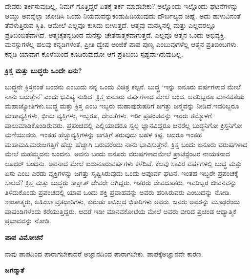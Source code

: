 ದೇವರು ತರ್ಕಿಸುವುದಿಲ್ಲ. ನಿಮಗೆ ಗೊತ್ತಿದ್ದರೆ ಏತಕ್ಕೆ ತರ್ಕ ಮಾಡಬೇಕು? ಅಲ್ಲೊಂದು ಇಲ್ಲೊಂದು ಘಟನೆಗಳನ್ನು ಆಯ್ದು ಅವನ್ನೆಲ್ಲಾ ಜೋಡಿಸಿ ಒಂದು ನಿಯಮವನ್ನು\break ಕಂಡುಹಿಡಿಯುವುದು ದೌರ್ಬಲ್ಯದ ಚಿಹ್ನೆ. ಅದು ಹುಳುವಿನಂತೆ ತೆವಳುತ್ತಿರುವ ಸ್ಥಿತಿ. ಆಮೇಲೆ ಎಲ್ಲವೂ ಕುಸಿದು ಬೀಳುತ್ತದೆ. ಆತ್ಮವು ಮನಸ್ಸಿನಲ್ಲಿ ಮತ್ತು ಎಲ್ಲದರಲ್ಲೂ ಪ್ರತಿಬಿಂಬಿತವಾಗಿದೆ. ಆತ್ಮಚೈತನ್ಯದಿಂದ ಮನಸ್ಸು ಚೇತನಾತ್ಮಕವಾಗುತ್ತದೆ. ಎಲ್ಲವೂ ಆತ್ಮನ ಒಂದು ಅಭಿವ್ಯಕ್ತಿ. ಮನಸ್ಸುಗಳೆಲ್ಲ ಹಲವು ಕನ್ನಡಿಗಳಂತೆ, ಪ್ರೀತಿ ದ್ವೇಷ ಅಂಜಿಕೆ ಪಾಪ ಪುಣ್ಯ ಎಂಬುವುಗಳೆಲ್ಲ ಆತ್ಮನ ಪ್ರತಿಬಿಂಬಗಳು. ಕನ್ನಡಿ ಯಾವಾಗ ಕೊಳೆಯಿಂದ ಕೂಡಿರುವುದೋ ಆಗ ಪ್ರತಿಬಿಂಬ ಸ್ಪಷ್ಟವಾಗಿರುವುದಿಲ್ಲ.

\begin{center}
\textbf{ಕ್ರಿಸ್ತ ಮತ್ತು ಬುದ್ಧರು ಒಂದೇ ಏನು?}
\end{center}

ಬುದ್ಧನೇ ಕ್ರಿಸ್ತನಂತೆ ಬಂದನು ಎಂಬುದು ನನ್ನ ಒಂದು ವಿಚಿತ್ರ ಕಲ್ಪನೆ. ಬುದ್ಧ ‘ಇನ್ನು ಐನೂರು ವರ್ಷಗಳಾದ ಮೇಲೆ ನಾನು ಬರುತ್ತೇನೆ’ ಎಂದು ಭವಿಷ್ಯ ನುಡಿದ. ಕ್ರಿಸ್ತ ಐನೂರು ವರ್ಷಗಳಾದ ಮೇಲೆ ಬಂದ. ಅವರಿಬ್ಬರೂ ಮಾನವತೆಯ ಮಹಾಜ್ಯೋತಿಗಳು.\break ಬುದ್ಧ ಮತ್ತು ಕ್ರಿಸ್ತ ಎಂಬ ಇಬ್ಬರು ಮಹಾಪುರುಷರಿಗೆ ಜಗತ್ತು ಜನ್ಮವನ್ನು ನೀಡಿದೆ.\break ಇವರಿಬ್ಬರೂ ಮಹಾವ್ಯಕ್ತಿಗಳು, ಭೀಮ ವ್ಯಕ್ತಿಗಳು, ಇಬ್ಬರೂ, ದೇವತೆಗಳು. ಇಡೀ ಪ್ರಪಂಚವನ್ನು ಇವರು ತಮ್ಮೊಳಗೆ ಪಾಲುಮಾಡಿಕೊಂಡಿರುವರು. ಪ್ರಪಂಚದಲ್ಲಿ ಎಲ್ಲಿಯಾದರೂ ಸ್ವಲ್ಪ ಜ್ಞಾನವಿದ್ದರೂ ಜನರೆಲ್ಲ ಬುದ್ಧನಿಗೋ ಕ್ರಿಸ್ತನಿಗೋ ಮಣಿಯುವರು. ಇಂತಹ ಹೆಚ್ಚು\break ವ್ಯಕ್ತಿಗಳನ್ನು ಜಗತ್ತಿಗೆ ತರುವುದು ಬಹಳ ಕಷ್ಟ. ಆದರೂ ಇಂತಹ ಮಹಾಮಹಿಮರು\break ಜಗತ್ತಿಗೆ ಹೆಚ್ಚು ಹೆಚ್ಚಾಗಿ ಬರುವರೆಂದು ನಾನು ಭಾವಿಸುತ್ತೇನೆ. ಕ್ರಿಸ್ತ ಬಂದು ಐನೂರು ವರುಷಗಳಾದ ಮೇಲೆ ಮಹಮ್ಮದನು ಬಂದನು. ಅವನು ಬಂದು ಐನೂರು ವರುಷಗಳಾದ\break ಮೇಲೆ ಪ್ರಾಟೆಸ್ಟೆಂಟರ ನಾಯಕನಾದ ಲೂಥರ್​ ಬಂದನು. ಅವನಾದ ಮೇಲೆ ಐದುನೂರು\break ವರ್ಷಗಳು ಕಳೆದಿವೆ. ಕೆಲವು ಸಾವಿರ ವರ್ಷಗಳಲ್ಲಿ ಬುದ್ಧ ಮತ್ತು ಏಸು ಎಂಬ ಎರಡು ವ್ಯಕ್ತಿಗಳನ್ನು ಜಗತ್ತು ಸೃಷ್ಟಿಸಿರುವುದು ಒಂದು ಅಪೂರ್ವ ಘಟನೆ. ಇಂತಹ ಇಬ್ಬರೇ ಪ್ರಪಂಚಕ್ಕೆ ಸಾಲದೆ? ಕ್ರಿಸ್ತ ಮತ್ತು ಬುದ್ಧರು ಸಾಕ್ಷಾತ್​ ದೇವರೇ ಆಗಿದ್ದರು. ಇತರರು ದೇವದೂತರು. ಇವರಿಬ್ಬರ ಜೀವನವನ್ನು ತಿಳಿದುಕೊಂಡು ಪ್ರಪಂಚದಲ್ಲಿ ಯಾವ ಒಂದು ಶಕ್ತಿ ಪ್ರವಾಹವನ್ನು ಅವರು ಹರಿಸಿರುವರು ಎಂಬುದನ್ನು ನೋಡಿ. ಶಾಂತಾತ್ಮರು, ಅಹಿಂಸಾ ವ್ರತಧಾರಿಗಳು, ಕುರುಡು ಕಾಸಿಲ್ಲದ ಭಿಕಾರಿಗಳು ಅವರು. ಜನರು ಅವರನ್ನು ಮೂಢರೆಂದು ಪಾಷಂಡಿಗಳೆಂದು ಕರೆಯುತ್ತಿದ್ದರು. ಆದರೆ ಇಡೀ ಮಾನವಕೋಟಿಯ ಮೇಲೆ ಅವರು ಬೀರಿದ ಪ್ರಚಂಡ ಆಧ್ಯಾತ್ಮಿಕ ಪ್ರಭಾವವನ್ನು ನೋಡಿ.

\vspace{-1cm}

\begin{center}
\textbf{ಪಾಪ ವಿಮೋಚನೆ}
\end{center}

ನಾವು ಪಾಪದಿಂದ ಪಾರಾಗಬೇಕಾದರೆ ಅಜ್ಞಾನದಿಂದ ಪಾರಾಗಬೇಕು. ಪಾಪಕ್ಕೆ\break ಅಜ್ಞಾನವೇ ಕಾರಣ.

\vspace{-1cm}

\begin{center}
\textbf{ಜಗನ್ಮಾತೆ}
\end{center}

